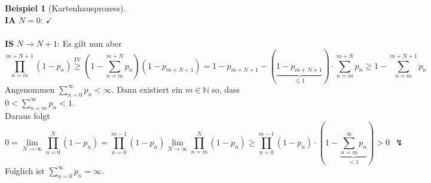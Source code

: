 \documentclass[a4paper,12pt]{scrartcl}
\theoremstyle{definition}
\newtheorem{bsp}{Beispiel}[section]
\begin{document}
\begin{bsp}[Kartenhausprozess]
\\
\textbf{IA} $N=0$: $\checkmark$
\\
\\
\textbf{IS} $N \to N+1$: Es gilt nun aber
\begin{equation*}
\prod_{n=m}^{m+N+1} (1-p_{n}) \stackrel{\mathrm{IV}}{\geq} (1 - \sum_{n=m}^{m+N}p_{n})(1-p_{m+N+1}) = 1 - p_{m+N+1} - (\underbrace{1-p_{m+N+1}}_{\leq 1}) \cdot \sum_{n=m}^{m+N}p_{n} \geq 1 - \sum_{n=m}^{m+N+1} p_{n}
\end{equation*}
Angenommen $\sum_{n=0}^{\infty}p_{n} < \infty$. Dann existiert ein $m \in \mathbb{N}$ so, dass $0 < \sum_{n=m}^{\infty} p_{n} < 1$.
\\
Daraus folgt
\begin{equation*}
0 = \lim_{N \to \infty} \prod_{n=0}^{N} (1-p_{n}) = \prod_{n=0}^{m-1} (1-p_{n})  \lim_{N \to \infty} \prod_{n=m}^{N} (1-p_{n}) \geq \prod_{n=0}^{m-1} (1-p_{n}) \cdot (1 - \underbrace{\sum_{n=m}^{\infty} p_{n}}_{<1}) > 0 \: \: \lightning
\end{equation*}
Folglich ist $\sum_{n=0}^{\infty} p_{n} = \infty$.
\end{bsp}
\end{document}
